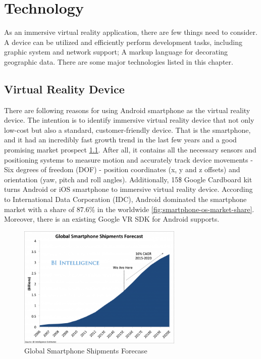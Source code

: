 \chapter{Technology}
\label{chapter-technology}

As an immersive virtual reality application, there are few things need to consider. A device can be utilized and efficiently perform development tasks, including graphic system and network support; A markup language for decorating geographic data. There are some major technologies listed in this chapter.

\section{Virtual Reality Device}

There are following reasons for using Android smartphone as the virtual reality device. The intention is to identify immersive virtual reality device that not only low-cost but also a standard, customer-friendly device. That is the smartphone, and it had an incredibly fast growth trend in the last few years and a good promising market prospect \ref{fig:smartphone-shipments-forecast}. After all, it contains all the necessary sensors and positioning systems to measure motion and accurately track device movements - Six degrees of freedom (DOF) - position coordinates (x, y and z offsets) and orientation (yaw, pitch and roll angles). Additionally, 15\$ Google Cardboard kit turns Android or iOS smartphone to immersive virtual reality device. According to International Data Corporation (IDC), Android dominated the smartphone market with a share of 87.6\% in the worldwide \ref{fig:smartphone-os-market-share}. Moreover, there is an existing Google VR SDK \cite{google.vr-sdk.2016} for Android supports.

\begin{figure}[H]
\caption[Global Smartphone Shipments Forecase]{Global Smartphone Shipments Forecase \cite{tony.global-smartphone-market.2015}}
\label{fig:smartphone-shipments-forecast}
\centering
\includegraphics[width=0.7\textwidth, keepaspectratio]{Figures/smartphone-shipments-forecast.png}
\decoRule
\end{figure}

